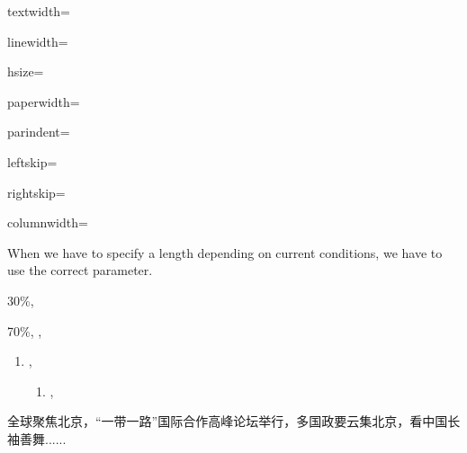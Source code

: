 \documentclass{ctexart}
\begin{document}
textwidth=\the\textwidth

linewidth=\the\linewidth

hsize=\the\hsize

paperwidth=\the\paperwidth

parindent=\the\parindent

leftskip=\the\leftskip

rightskip=\the\rightskip

columnwidth=\the\columnwidth


When we have to specify a length depending on current conditions, we have to use the correct parameter. 



	\begin{minipage}[c][1.5em][c]{.3\textwidth}
	30\%,\the\textwidth
	\end{minipage}
	\begin{minipage}[c][1.5em][c]{.7\textwidth}
	70\%, \the\textwidth,\the\linewidth
	\end{minipage}
	
\begin{enumerate}
	\item
	\the\textwidth,\the\linewidth
	\begin{enumerate}
\item
\the\textwidth,\the\linewidth
\end{enumerate}
\end{enumerate}

全球聚焦北京，“一带一路”国际合作高峰论坛举行，{\the\textwidth}多国政要云集北京，看中国长袖善舞......
\end{document}
